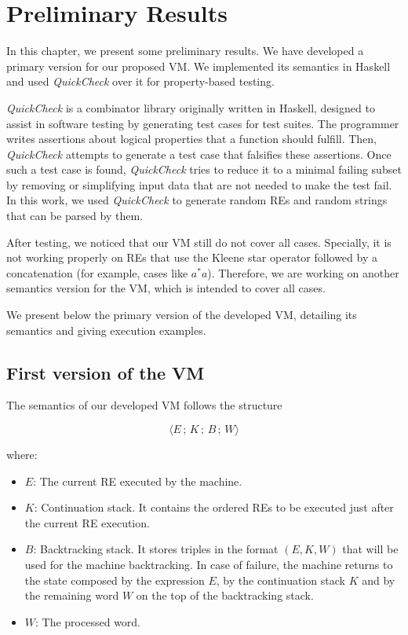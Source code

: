\documentclass[oneside,12pt]{scrbook}
\theoremstyle{definition}
\theoremstyle{plain}
\theoremstyle{definition}
\begin{document}



\chapter{Preliminary Results}\label{chapter:results}

In this chapter, we present some preliminary results. We have developed a primary version for our proposed VM. We implemented its semantics in Haskell and used \textit{QuickCheck} over it for property-based testing.

\textit{QuickCheck} is a combinator library originally written in Haskell, designed to assist in software testing by generating test cases for test suites. The programmer writes assertions about logical properties that a function should fulfill. Then, \textit{QuickCheck} attempts to generate a test case that falsifies these assertions. Once such a test case is found, \textit{QuickCheck} tries to reduce it to a minimal failing subset by removing or simplifying input data that are not needed to make the test fail. In this work, we used \textit{QuickCheck} to generate random REs and random strings that can be parsed by them.

After testing, we noticed that our VM still do not cover all cases. Specially, it is not working properly on REs that use the Kleene star operator followed by a concatenation (for example, cases like $a^*a$). Therefore, we are working on another semantics version for the VM, which is intended to cover all cases.

We present below the primary version of the developed VM, detailing its semantics and giving execution examples.

\section{First version of the VM}

The semantics of our developed VM follows the structure

\[
\langle E \,;\, K \,;\, B \,;\, W \rangle
\]

where:

\begin{itemize}
	\item $E$: The current RE executed by the machine. 
	\item $K$: Continuation stack. It contains the ordered REs to be executed just after the current RE execution.
	\item $B$: Backtracking stack. It stores triples in the format $(E,K,W)$ that  will be used for the machine backtracking. In case of failure, the machine returns to the state composed by the expression $E$, by the continuation stack $K$ and by the remaining word $W$ on the top of the backtracking stack.
	\item $W$: The processed word.
\end{itemize}
\end{document}
